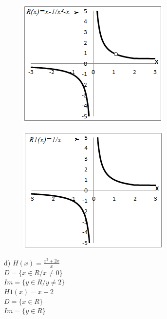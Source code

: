 \begin{respostas}{3}
	\begin{figure}[H]
		\begin{Center}
			\includegraphics[width=2.98in,height=2.54in]{capitulos/outras_funcoes/media/image49.png}
		\end{Center}
	\end{figure}

	\begin{figure}[H]
		\begin{Center}
			\includegraphics[width=2.99in,height=2.51in]{capitulos/outras_funcoes/media/image50.png}
		\end{Center}
	\end{figure}


	d)  \( H \left( x \right) =\frac{x^2+2x}{x}\) \\\(D= \{ x \in R/x \neq 0 \} \) \\ \( Im= \{ y \in R/y \neq 2 \}  \)\\

	\( H1 \left( x \right) =x+2\) \\\(D= \{ x \in R \}  \) \\ \( Im= \{ y \in R \}  \)


\end{respostas}
